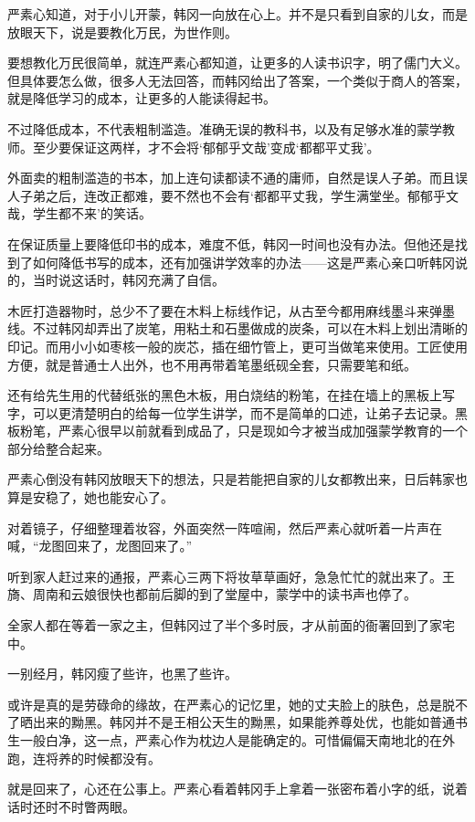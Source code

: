 严素心知道，对于小儿开蒙，韩冈一向放在心上。并不是只看到自家的儿女，而是放眼天下，说是要教化万民，为世作则。

要想教化万民很简单，就连严素心都知道，让更多的人读书识字，明了儒门大义。但具体要怎么做，很多人无法回答，而韩冈给出了答案，一个类似于商人的答案，就是降低学习的成本，让更多的人能读得起书。

不过降低成本，不代表粗制滥造。准确无误的教科书，以及有足够水准的蒙学教师。至少要保证这两样，才不会将‘郁郁乎文哉’变成‘都都平丈我’。

外面卖的粗制滥造的书本，加上连句读都读不通的庸师，自然是误人子弟。而且误人子弟之后，连改正都难，要不然也不会有‘都都平丈我，学生满堂坐。郁郁乎文哉，学生都不来’的笑话。

在保证质量上要降低印书的成本，难度不低，韩冈一时间也没有办法。但他还是找到了如何降低书写的成本，还有加强讲学效率的办法——这是严素心亲口听韩冈说的，当时说这话时，韩冈充满了自信。

木匠打造器物时，总少不了要在木料上标线作记，从古至今都用麻线墨斗来弹墨线。不过韩冈却弄出了炭笔，用粘土和石墨做成的炭条，可以在木料上划出清晰的印记。而用小小如枣核一般的炭芯，插在细竹管上，更可当做笔来使用。工匠使用方便，就是普通士人出外，也不用再带着笔墨纸砚全套，只需要笔和纸。

还有给先生用的代替纸张的黑色木板，用白烧结的粉笔，在挂在墙上的黑板上写字，可以更清楚明白的给每一位学生讲学，而不是简单的口述，让弟子去记录。黑板粉笔，严素心很早以前就看到成品了，只是现如今才被当成加强蒙学教育的一个部分给整合起来。

严素心倒没有韩冈放眼天下的想法，只是若能把自家的儿女都教出来，日后韩家也算是安稳了，她也能安心了。

对着镜子，仔细整理着妆容，外面突然一阵喧闹，然后严素心就听着一片声在喊，“龙图回来了，龙图回来了。”

听到家人赶过来的通报，严素心三两下将妆草草画好，急急忙忙的就出来了。王旖、周南和云娘很快也都前后脚的到了堂屋中，蒙学中的读书声也停了。

全家人都在等着一家之主，但韩冈过了半个多时辰，才从前面的衙署回到了家宅中。

一别经月，韩冈瘦了些许，也黑了些许。

或许是真的是劳碌命的缘故，在严素心的记忆里，她的丈夫脸上的肤色，总是脱不了晒出来的黝黑。韩冈并不是王相公天生的黝黑，如果能养尊处优，也能如普通书生一般白净，这一点，严素心作为枕边人是能确定的。可惜偏偏天南地北的在外跑，连将养的时候都没有。

就是回来了，心还在公事上。严素心看着韩冈手上拿着一张密布着小字的纸，说着话时还时不时瞥两眼。

